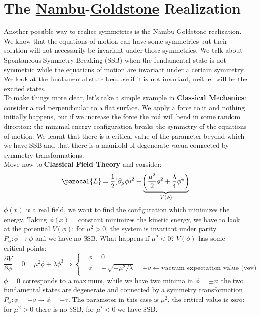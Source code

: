 \documentclass[../main.tex]{subfiles}
\begin{document}
\section{The \href{https://en.wikipedia.org/wiki/Yoichiro_Nambu}{Nambu}-\href{https://en.wikipedia.org/wiki/Jeffrey_Goldstone}{Goldstone} Realization}
Another possible way to realize symmetries is the Nambu-Goldstone realization. We know that the equations of motion can have some symmetries but their solution will not necessarily be invariant under those symmetries. We talk about Spontaneous Symmetry Breaking (SSB) when the fundamental state is not symmetric while the equations of motion are invariant under a certain symmetry. We look at the fundamental state because if it is not invariant, neither will be the excited states.\\
To make things more clear, let's take a simple example in \textbf{Classical Mechanics}: consider a rod perpendicular to a flat surface. We apply a force to it and nothing initially happens, but if we increase the force the rod will bend in some random direction: the minimal energy configuration breaks the symmetry of the equations of motion. We learnt that there is a critical value of the parameter beyond which we have SSB and that there is a manifold of degenerate vacua connected by symmetry transformations.\\
Move now to \textbf{Classical Field Theory} and consider:
\[
\pazocal{L}=\frac{1}{2}(\partial_\mu\phi)^2-\underbrace{\left(\frac{\mu^2}{2}\phi^2+\frac{\lambda}{4}\phi^4\right)}_{V(\phi)}
\]
$\phi(x)$ is a real field, we want to find the configuration which minimizes the energy. Taking $\phi(x)=$constant minimizes the kinetic energy, we have to look at the potential $V(\phi)$: for $\mu^2>0$, the system is invariant under parity $P_\phi:\phi\to\phi$ and we have no SSB. What happens if $\mu^2<0$? $V(\phi)$ has some critical points:
\[
\frac{\partial V}{\partial\phi}=0=\mu^2\phi+\lambda\phi^3\Rightarrow
\left\{
\begin{aligned}
&\phi=0\\
&\phi=\pm\sqrt{-\mu^2/\lambda}=\pm v\xleftarrow[]{}\text{vacuum expectation value (vev)}
\end{aligned}
\right.
\]
$\phi=0$ corresponds to a maximum, while we have two minima in $\phi=\pm v$: the two fundamental states are degenerate and connected by a symmetry transformation $P_\phi: \phi=+v\to\phi=-v$. The parameter in this case is $\mu^2$, the critical value is zero: for $\mu^2>0$ there is no SSB, for $\mu^2<0$ we have SSB.\\
\end{document}
